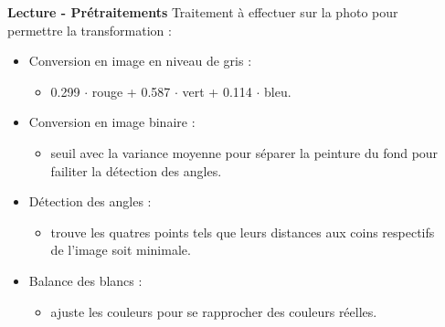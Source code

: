 \documentclass{beamer}
\begin{document}
\begin{frame}[t]
\begin{columns}[t]
\begin{column}{.49\linewidth}
\begin{block}{\centering \textbf{Lecture - Prétraitements}}
                    Traitement à effectuer sur la photo pour permettre la transformation :
                    \begin{itemize}[label=\textbullet]
                        \item Conversion en image en niveau de gris :
                        \begin{itemize}[label=$\rightarrow$]
                            \item 0.299 $\cdot$ rouge + 0.587 $\cdot$ vert + 0.114 $\cdot$ bleu.
                        \end{itemize}
                        \item Conversion en image binaire :
                        \begin{itemize}[label=$\rightarrow$]
                            \item seuil avec la variance moyenne pour séparer la peinture du fond pour failiter la détection des angles.
                        \end{itemize}
                        \item Détection des angles :
                        \begin{itemize}[label=$\rightarrow$]
                            \item trouve les quatres points tels que leurs distances aux coins respectifs de l'image soit minimale.
                        \end{itemize}
                        \item Balance des blancs :
                        \begin{itemize}[label=$\rightarrow$]
                            \item ajuste les couleurs pour se rapprocher des couleurs réelles.
                        \end{itemize}
                    \end{itemize}

                    \vspace{0.5cm}
                \end{block}
            \end{column}


            \begin{column}{.49\linewidth}


\end{column}
\end{columns}
\end{frame}
\end{document}
